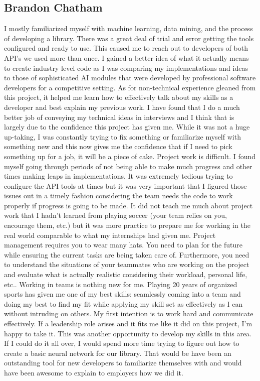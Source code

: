 \documentclass[10pt,letterpaper,onecolumn,draftclsnofoot]{IEEEtran}
\begin{document}
\subsection{Brandon Chatham}
I mostly familiarized myself with machine learning, data mining, and the process of developing a library. There was a great deal of trial and error getting the tools configured and ready to use. This caused me to reach out to developers of both API's we used more than once. I gained a better idea of what it actually means to create industry level code as I was comparing my implementations and ideas to those of sophisticated AI modules that were developed by professional software developers for a competitive setting. 
As for non-technical experience gleaned from this project, it helped me learn how to effectively talk about my skills as a developer and best explain my previous work. I have found that I do a much better job of conveying my technical ideas in interviews and I think that is largely due to the confidence this project has given me. While it was not a huge up-taking, I was constantly trying to fix something or familiarize myself with something new and this now gives me the confidence that if I need to pick something up for a job, it will be a piece of cake. 
Project work is difficult. I found myself going through periods of not being able to make much progress and other times making leaps in implementations. It was extremely tedious trying to configure the API tools at times but it was very important that I figured those issues out in a timely fashion considering the team needs the code to work properly if progress is going to be made. It did not teach me much about project work that I hadn't learned from playing soccer (your team relies on you, encourage them, etc.) but it was more practice to prepare me for working in the real world comparable to what my internships had given me. 
Project management requires you to wear many hats. You need to plan for the future while ensuring the current tasks are being taken care of. Furthermore, you need to understand the situations of your teammates who are working on the project and evaluate what is actually realistic considering their workload, personal life, etc.. 
Working in teams is nothing new for me. Playing 20 years of organized sports has given me one of my best skills: seamlessly coming into a team and doing my best to find my fit while applying my skill set as effectively as I can without intruding on others. My first intention is to work hard and communicate effectively. If a leadership role arises and it fits me like it did on this project, I'm happy to take it. This was another opportunity to develop my skills in this area.
If I could do it all over, I would spend more time trying to figure out how to create a basic neural network for our library. That would be have been an outstanding tool for new developers to familiarize themselves with and would have been awesome to explain to employers how we did it.
\end{document}
